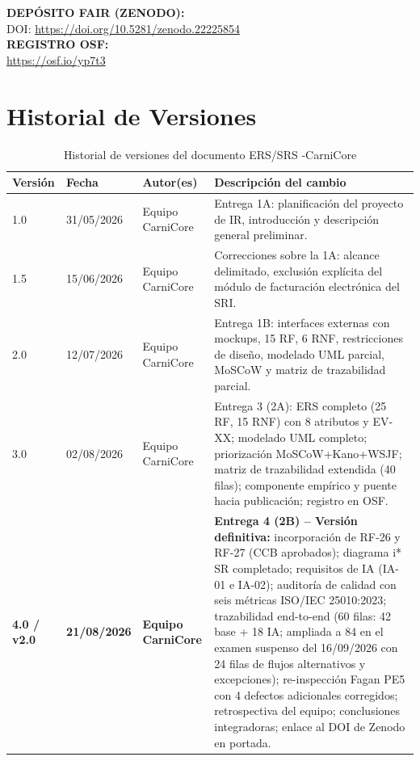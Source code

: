\documentclass[11pt,a4paper]{article}
\begin{document}
\begin{titlepage}
    \textbf{DEPÓSITO FAIR (ZENODO):}\\[0.2cm]
    DOI: \url{https://doi.org/10.5281/zenodo.22225854}\\[0.2cm]
    \textbf{REGISTRO OSF:}\\[0.2cm]
    \url{https://osf.io/yp7t3}\\[0.4cm]
    \vfill
\end{titlepage}

\newpage
\section*{Historial de Versiones}
\begin{longtable}{|p{1.5cm}|p{2.2cm}|p{3cm}|p{8cm}|}
\caption{Historial de versiones del documento ERS/SRS -CarniCore}\\
\hline
\textbf{Versión} & \textbf{Fecha} & \textbf{Autor(es)} & \textbf{Descripción del cambio} \\
\hline
1.0 & 31/05/2026 & Equipo CarniCore & Entrega 1A: planificación del proyecto de IR, introducción y descripción general preliminar. \\
\hline
1.5 & 15/06/2026 & Equipo CarniCore & Correcciones sobre la 1A: alcance delimitado, exclusión explícita del módulo de facturación electrónica del SRI. \\
\hline
2.0 & 12/07/2026 & Equipo CarniCore & Entrega 1B: interfaces externas con mockups, 15 RF, 6 RNF, restricciones de diseño, modelado UML parcial, MoSCoW y matriz de trazabilidad parcial. \\
\hline
3.0 & 02/08/2026 & Equipo CarniCore & Entrega 3 (2A): ERS completo (25 RF, 15 RNF) con 8 atributos y EV-XX; modelado UML completo; priorización MoSCoW+Kano+WSJF; matriz de trazabilidad extendida (40 filas); componente empírico y puente hacia publicación; registro en OSF. \\
\hline
\textbf{4.0 / v2.0} & \textbf{21/08/2026} & \textbf{Equipo CarniCore} & \textbf{Entrega 4 (2B) -- Versión definitiva:} incorporación de RF-26 y RF-27 (CCB aprobados); diagrama i* SR completado; requisitos de IA (IA-01 e IA-02); auditoría de calidad con seis métricas ISO/IEC 25010:2023; trazabilidad end-to-end (60 filas: 42 base + 18 IA; ampliada a 84 en el examen suspenso del 16/09/2026 con 24 filas de flujos alternativos y excepciones); re-inspección Fagan PE5 con 4 defectos adicionales corregidos; retrospectiva del equipo; conclusiones integradoras; enlace al DOI de Zenodo en portada. \\

\end{longtable}
\end{document}
